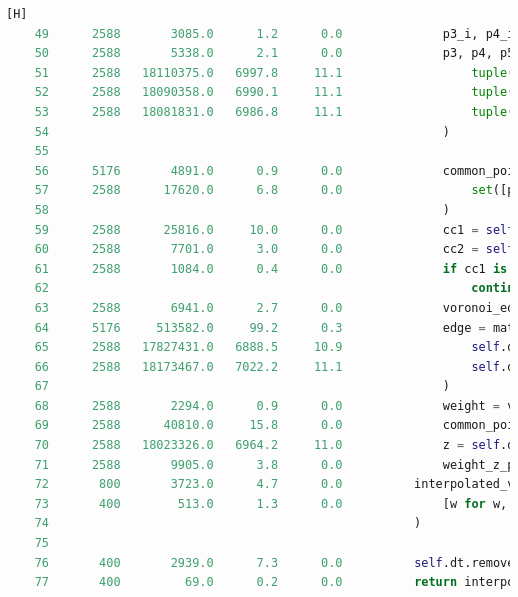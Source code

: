 \documentclass{article}
\begin{document}
\begin{lstlisting}[language=Python, caption={Interpolation Code with Execution Time}, label={code1},basicstyle={\fontsize{5.5}{10}\selectfont\ttfamily}][H]
    49      2588       3085.0      1.2      0.0              p3_i, p4_i, p5_i = next_tri
    50      2588       5338.0      2.1      0.0              p3, p4, p5 = (
    51      2588   18110375.0   6997.8     11.1                  tuple(self.dt.points[p3_i]),
    52      2588   18090358.0   6990.1     11.1                  tuple(self.dt.points[p4_i]),
    53      2588   18081831.0   6986.8     11.1                  tuple(self.dt.points[p5_i]),
    54                                                       )
    55                                           
    56      5176       4891.0      0.9      0.0              common_points_indices = list(
    57      2588      17620.0      6.8      0.0                  set([p0_i, p1_i, p2_i]).intersection(set([p3_i, p4_i, p5_i]))
    58                                                       )
    59      2588      25816.0     10.0      0.0              cc1 = self._circimcircle_center(p0, p1, p2)
    60      2588       7701.0      3.0      0.0              cc2 = self._circimcircle_center(p3, p4, p5)
    61      2588       1084.0      0.4      0.0              if cc1 is None or cc2 is None:
    62                                                           continue
    63      2588       6941.0      2.7      0.0              voronoi_edge_length = math.dist(cc1, cc2)
    64      5176     513582.0     99.2      0.3              edge = math.dist(
    65      2588   17827431.0   6888.5     10.9                  self.dt.points[common_points_indices[0]],
    66      2588   18173467.0   7022.2     11.1                  self.dt.points[common_points_indices[1]],
    67                                                       )
    68      2588       2294.0      0.9      0.0              weight = voronoi_edge_length / edge
    69      2588      40810.0     15.8      0.0              common_points_indices.remove(p_index)
    70      2588   18023326.0   6964.2     11.0              z = self.dt.points[common_points_indices[0]][2]
    71      2588       9905.0      3.8      0.0              weight_z_pairs.append([weight, z])
    72       800       3723.0      4.7      0.0          interpolated_value = sum([w * z for w, z in weight_z_pairs]) / sum(
    73       400        513.0      1.3      0.0              [w for w, _ in weight_z_pairs]
    74                                                   )
    75                                           
    76       400       2939.0      7.3      0.0          self.dt.remove(p_index)
    77       400         69.0      0.2      0.0          return interpolated_value
\end{lstlisting}
\end{document}

